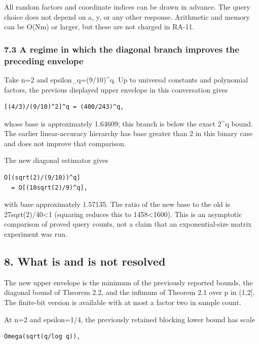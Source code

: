 \documentclass[
  10pt,
]{article}
\begin{document}
All random factors and coordinate indices can be drawn in advance. The
query choice does not depend on a, y, or any other response. Arithmetic
and memory can be O(Nm) or larger, but these are not charged in RA-11.

\subsubsection{7.3 A regime in which the diagonal branch improves the
preceding
envelope}\label{a-regime-in-which-the-diagonal-branch-improves-the-preceding-envelope}

Take n=2 and epsilon\_q=(9/10)\^{}q. Up to universal constants and
polynomial factors, the previous displayed upper envelope in this
conversation gives

\begin{verbatim}
[(4/3)/(9/10)^2]^q = (400/243)^q,
\end{verbatim}

whose base is approximately 1.64609; this branch is below the exact
2\^{}q bound. The earlier linear-accuracy hierarchy has base greater
than 2 in this binary case and does not improve that comparison.

The new diagonal estimator gives

\begin{verbatim}
O[(sqrt(2)/(9/10))^q]
  = O[(10sqrt(2)/9)^q],
\end{verbatim}

with base approximately 1.57135. The ratio of the new base to the old is
27sqrt(2)/40\textless1 (squaring reduces this to 1458\textless1600).
This is an asymptotic comparison of proved query counts, not a claim
that an exponential-size matrix experiment was run.

\subsection{8. What is and is not
resolved}\label{what-is-and-is-not-resolved}

The new upper envelope is the minimum of the previously reported bounds,
the diagonal bound of Theorem 2.2, and the infimum of Theorem 2.1 over p
in (1,2{]}. The finite-bit version is available with at most a factor
two in sample count.

At n=2 and epsilon=1/4, the previously retained blocking lower bound has
scale

\begin{verbatim}
Omega(sqrt(q/log q)),
\end{verbatim}
\end{document}
